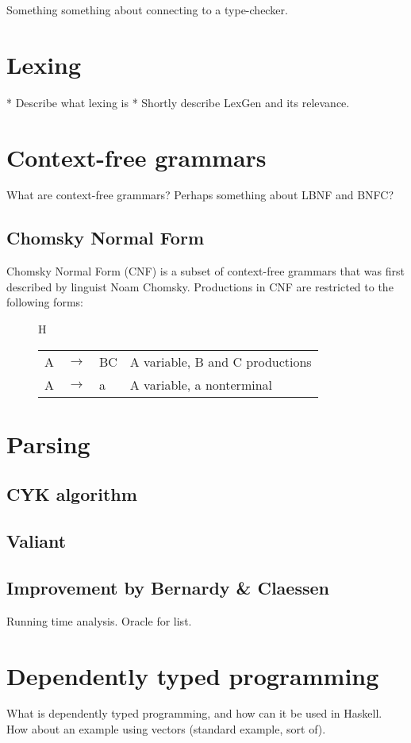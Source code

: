 \documentclass[a4paper,12pt,twosided]{report}
\begin{document}
Something something about connecting to a type-checker.

\section{Lexing}
* Describe what lexing is
* Shortly describe LexGen and its relevance.

\section{Context-free grammars}
What are context-free grammars? Perhaps something about LBNF and BNFC?

\subsection{Chomsky Normal Form}
Chomsky Normal Form (CNF) is a subset of context-free grammars that was first
described by linguist Noam Chomsky. Productions in CNF are restricted to the
following forms:

\begin{figure}{H}
\begin{tabular}{l l l l}
    A & $\rightarrow$ & BC & A variable, B and C productions \\
    A & $\rightarrow$ & a & A variable, a nonterminal \\
\end{tabular}
\end{figure}

\section{Parsing}
\subsection{CYK algorithm}
\subsection{Valiant}
\subsection{Improvement by Bernardy \& Claessen}
Running time analysis. Oracle for list.

\section{Dependently typed programming}
What is dependently typed programming, and how can it be used in Haskell. How
about an example using vectors (standard example, sort of).
\end{document}
